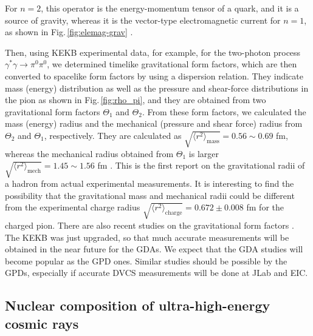\documentclass{PoS}
\begin{document}
\noindent
For $n=2$, this operator is the energy-momentum tensor
of a quark, and it is a source of gravity, whereas
it is the vector-type electromagnetic current for $n=1$,
as shown in Fig.\,\ref{fig:elemag-grav} \cite{kst-2018}.

Then, using KEKB experimental data, for example, for the two-photon process
$\gamma^* \gamma \to \pi^0 \pi^0$, we determined timelike gravitational
form factors, which are then converted to spacelike form factors
by using a dispersion relation.
They indicate mass (energy) distribution
as well as the pressure and shear-force distributions in the pion
as shown in Fig.\,\ref{fig:rho_pi},
and they are obtained from two gravitational form factors
$\Theta_1$ and $\Theta_2$.
From these form factors, we calculated the mass (energy) radius 
and the mechanical (pressure and shear force) radius
from $\Theta_2$ and $\Theta_1$, respectively.
They are calculated as
$\sqrt {\langle r^2 \rangle _{\text{mass}}} =0.56 \sim 0.69$ fm,
whereas the mechanical radius obtained from $\Theta_1$ is larger 
$\sqrt {\langle r^2 \rangle _{\text{mech}}} =1.45 \sim 1.56$ fm
\cite{kst-2018}.
This is the first report on the gravitational radii of a hadron
from actual experimental measurements.
It is interesting to find the possibility 
that the gravitational mass and mechanical radii 
could be different from the experimental charge radius 
$\sqrt {\langle r^2 \rangle _{\text{charge}}} =0.672 \pm 0.008$ fm
for the charged pion.
There are also recent studies on the gravitational form factors
\cite{mechanical}.
The KEKB was just upgraded, so that much accurate measurements will
be obtained in the near future for the GDAs.
We expect that the GDA studies will become popular as the GPD ones.
Similar studies should be possible by the GPDs, especially
if accurate DVCS measurements will be done at JLab and EIC.

\subsection{Nuclear composition of ultra-high-energy cosmic rays}
\label{cosmic-ray}
\end{document}
